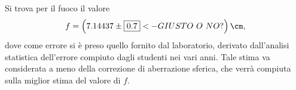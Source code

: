Si trova per il fuoco il valore 
\[ f=\left(7.14437 \pm \framebox{0.7} <- GIUSTO\ O\ NO?\right) \cm , \] 
dove come errore si \`e preso quello fornito dal laboratorio, derivato dall'analisi statistica dell'errore compiuto dagli studenti nei vari anni. Tale stima va considerata a meno della correzione di aberrazione sferica, che verr\`a compiuta sulla miglior stima del valore di $ f $.

